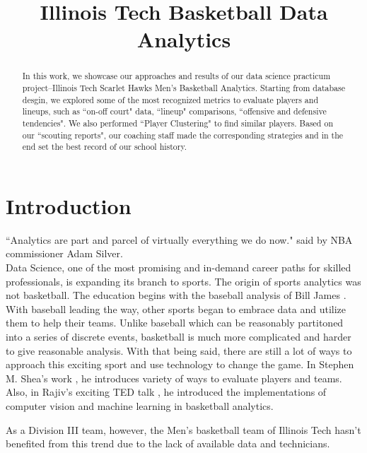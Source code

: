 \documentclass[conference]{IEEEtran}
\begin{document}
\title{Illinois Tech Basketball Data Analytics}
\author 
{
}
\maketitle

\begin{abstract}
In this work, we showcase our approaches and results of our data science practicum project--Illinois Tech Scarlet Hawks Men's Basketball Analytics. Starting from database desgin, we explored some of the most recognized metrics to evaluate players and lineups, such as ``on-off court" data, ``lineup" comparisons, ``offensive and defensive tendencies". We also performed ``Player Clustering" to find similar players. Based on our ``scouting reports", our coaching staff made the corresponding strategies and in the end set the best record of our school history.
\end{abstract}

\section{Introduction}

``Analytics are part and parcel of virtually everything we do now." said by NBA commissioner Adam Silver. \\
Data Science, one of the most promising and in-demand career paths for skilled professionals, is expanding its branch to sports. The origin of sports analytics was not basketball. The education begins with the baseball analysis of Bill James \cite{james2010new}. With baseball leading the way, other sports began to embrace data and utilize them to help their teams. Unlike baseball which can be reasonably partitoned into a series of discrete events, basketball is much more complicated and harder to give reasonable analysis. With that being said, there are still a lot of ways to approach this exciting sport and use technology to change the game. In Stephen M. Shea's work \cite{1492923176}, he introduces variety of ways to evaluate players and teams. Also, in  Rajiv's exciting TED talk \cite{tedtalk}, he introduced the implementations of computer vision and machine learning in basketball analytics.

As a Division III team, however, the Men's basketball team of Illinois Tech hasn't benefited from this trend due to the lack of available data and technicians.
\end{document}
